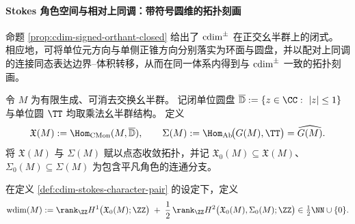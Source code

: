 \paragraph{Stokes 角色空间与相对上同调：带符号圆维的拓扑刻画}\label{para:cdim-signed-stokes-cohomology}
命题 \ref{prop:cdim-signed-orthant-closed} 给出了 \(\operatorname{cdim}^{\pm}\) 在正交幺半群上的闭式。
相应地，可将单位元方向与单侧正锥方向分别落实为环面与圆盘，并以配对上同调的连接同态表达边界--体积转移，从而在同一体系内得到与 \(\operatorname{cdim}^{\pm}\) 一致的拓扑刻画。

\begin{definition}\label{def:cdim-stokes-character-pair}
令 \(M\) 为有限生成、可消去交换幺半群。
记闭单位圆盘 \(\overline{\mathbb D}:=\{z\in\CC:\ |z|\le 1\}\) 与单位圆 \(\TT\) 均取乘法幺半群结构。
定义
\[
\mathfrak X(M):=\Hom_{\mathrm{CMon}}(M,\overline{\mathbb D}),
\qquad
\Sigma(M):=\Hom_{\mathrm{Ab}}\!\bigl(G(M),\TT\bigr)=\widehat{G(M)}.
\]
将 \(\mathfrak X(M)\) 与 \(\Sigma(M)\) 赋以点态收敛拓扑，并记
\(\mathfrak X_0(M)\subseteq \mathfrak X(M)\)、\(\Sigma_0(M)\subseteq \Sigma(M)\)
为包含平凡角色的连通分支。
\end{definition}

\begin{definition}\label{def:cdim-stokes-weighted-dimension}
在定义 \ref{def:cdim-stokes-character-pair} 的设定下，定义
\[
\mathrm{wdim}(M)
:=\rank_{\ZZ}H^{1}\bigl(\mathfrak X_0(M);\ZZ\bigr)
\;+\;\frac12\,\rank_{\ZZ}H^{2}\bigl(\mathfrak X_0(M),\Sigma_0(M);\ZZ\bigr)
\in\tfrac12\NN\cup\{0\}.
\]
\end{definition}

